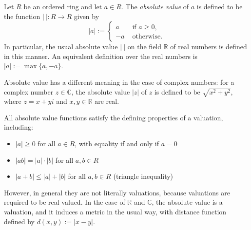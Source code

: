 \documentclass[12pt]{article}
\begin{document}
Let $R$ be an ordered ring and let $a \in R$. The \emph{absolute value} of $a$ is defined to be the function $|\ |\colon R \to R$ given by
$$
|a| :=
\begin{cases}
a & \text{\ \ if } a \geq 0, \\
-a & \text{\ \ otherwise.}
\end{cases}
$$
In particular, the usual absolute value $|\ |$ on the field $\mathbb{R}$ of real numbers is defined in this manner. An equivalent definition over the real numbers is $|a| := \max\{a, -a\}$.

Absolute value has a different meaning in the case of complex numbers: for a complex number $z \in \mathbb{C}$, the absolute value $|z|$ of $z$ is defined to be $\sqrt{x^2+y^2}$, where $z = x+yi$ and $x,y \in \mathbb{R}$ are real.

All absolute value functions satisfy the defining properties of a valuation, including:
\begin{itemize}
\item $|a| \ge 0$ for all $a \in R$, with equality if and only if $a = 0$
\item $|ab| = |a| \cdot |b|$ for all $a,b \in R$
\item $|a+b| \le |a| + |b|$ for all $a, b \in R$ (triangle inequality)
\end{itemize}

However, in general they are not literally valuations, because valuations are required to be real valued.  In the case of $\mathbb{R}$ and $\mathbb{C}$, the absolute value is a valuation, and it induces a metric in the usual way, with distance function defined by $d(x,y) := |x-y|$.
\end{document}
